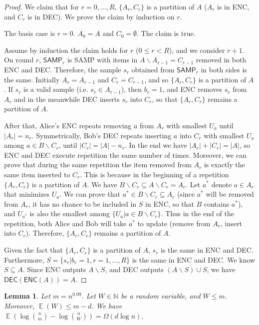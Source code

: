 \documentclass[10pt]{article}
\newtheorem{lemma}{Lemma}
\DeclareMathOperator*{\E}{\mathbb{E}}
\newcommand{\samp}{\textsf{SAMP}\xspace}
\newcommand{\enc}{\textsf{ENC}\xspace}
\newcommand{\dec}{\textsf{DEC}\xspace}
\begin{document}
\begin{proof}
  We claim that for $r=0,\ldots, R$, $\{A_r, C_r\}$ is a partition of $A$ ($A_r$ is in \enc, and $C_r$ is in \dec). We prove the claim by induction on $r$.
  
  The basis case is $r=0$. $A_0=A$ and $C_0=\emptyset$. The claim is true.
  
  Assume by induction the claim holds for $r$ ($0\le r < R$), and we consider $r+1$. 
  On round $r$, $\samp_r$ is \samp with items in $A\backslash A_{r-1}=C_{r-1}$ removed in both \enc and \dec. Therefore, the sample $s_r$ obtained from $\samp_r$ in both sides is the same. Initially $A_r=A_{r-1}$ and $C_r=C_{r-1}$, and so $\{A_r,C_r\}$ is a partition of $A$. If $s_r$ is a valid sample (i.e. $s_r\in A_{r-1}$), then $b_r=1$, and \enc removes $s_r$ from $A_r$ and in the meanwhile \dec inserts $s_r$ into $C_r$, so that $\{A_r, C_r\}$ remains a partition of $A$. 
  
  After that, Alice's \enc repeats removing $a$ from $A_r$ with smallest $U_a$ until $|A_r|=n_r$. Symmetrically, Bob's \dec repeats inserting $a$ into $C_r$ with smallest $U_a$ among $a\in B\backslash C_r$, until $|C_r|=|A|-n_r$. In the end we have $|A_r|+|C_r|=|A|$, so \enc and \dec execute repetition the same number of times. Moreover, we can prove that during the same repetition the item removed from $A_r$ is exactly the same item inserted to $C_r$. This is because in the beginning of a repetition $\{A_r, C_r\}$ is a partition of $A$. We have $B\backslash C_r\subseteq A\backslash C_r=A_r$. Let $a^*$ denote  $a\in A_r$ that minimizes $U_a$. We can prove that $a^*\in B\backslash C_r\subseteq A_r$ (since $a^*$ will be removed from $A_r$, it has no chance to be included in $S$ in \enc, so that $B$ contains $a^*$), and $U_{a^*}$ is also the smallest among $\{U_a|a\in B\backslash C_r\}$. Thus in the end of the repetition, both Alice and Bob will take $a^{*}$ to update (remove from $A_r$, insert into $C_r$). Therefore, $\{A_r, C_r\}$ remains a partition of $A$.
  
  Given the fact that $\{A_r, C_r\}$ is a partition of $A$, $s_r$ is the same in \enc and \dec. Furthermore, $S=\{s_r|b_r=1,r=1,\ldots, R\}$ is the same in \enc and \dec. We know $S\subseteq A$. Since \enc outputs $A\backslash S$, and \dec outputs $(A\backslash S)\cup S$, we have $\dec(\enc(A))=A$. 
\end{proof}

\begin{lemma} \label{lemma:bits-saving}
  Let $m=n^{0.99}$. Let $W\in \mathbb{N}$ be a random variable, and $W\le m$. Moreover, $\E(W)\le m-d$. We have $\E(\log {n \choose m}-\log {n \choose W})=\Omega(d \log n)$.
\end{lemma}
\end{document}
